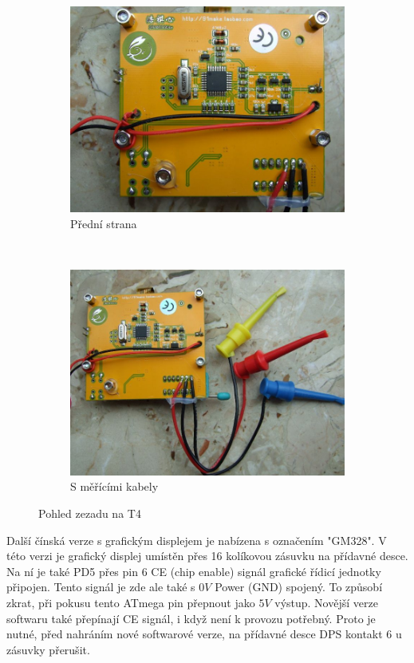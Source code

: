 \begin{figure}[H]
  \begin{subfigure}[b]{.5\textwidth}
    \centering
    \includegraphics[width=1.\textwidth]{../PNG/T4_back.JPG}
    \caption{Přední strana}
  \end{subfigure}
  ~
  \begin{subfigure}[b]{.5\textwidth}
    \centering
    \includegraphics[width=1.\textwidth]{../PNG/T4_back_clips.JPG}
    \caption{S měřícími kabely}
  \end{subfigure}
  \caption{Pohled zezadu na T4}
  \label{fig:T4_back}
\end{figure}

Další čínská verze s grafickým displejem je nabízena s označením "GM328".
V této verzi je grafický displej umístěn přes 16 kolíkovou zásuvku na přídavné desce. Na ní je také
PD5 přes pin 6 CE (chip enable) signál grafické řídicí jednotky připojen. Tento signál je zde ale
také s \(0V\) Power (GND) spojený. 
To způsobí zkrat, při pokusu tento ATmega pin přepnout jako \(5V\) výstup.
Novější verze softwaru také přepínají CE signál, i když není k provozu potřebný.
Proto je nutné, před nahráním nové softwarové verze, na přídavné desce DPS kontakt 6 u zásuvky
přerušit.

